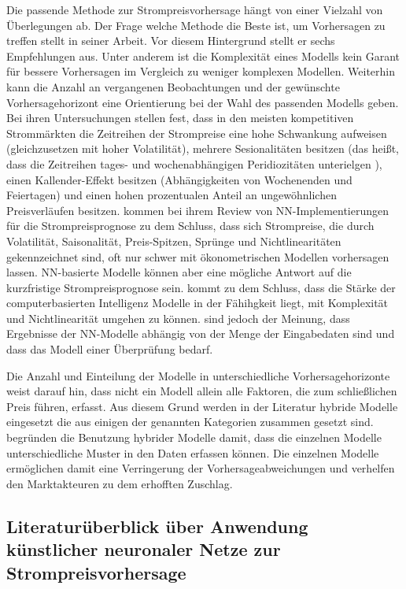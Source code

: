 Die passende Methode zur Strompreisvorhersage hängt von einer Vielzahl von Überlegungen ab. Der Frage welche Methode die Beste ist, um Vorhersagen zu treffen stellt \citet{Chatfield1988} in seiner Arbeit. Vor diesem Hintergrund stellt er sechs Empfehlungen aus. Unter anderem ist die Komplexität eines Modells kein Garant für bessere Vorhersagen im Vergleich zu weniger komplexen Modellen. Weiterhin kann die Anzahl an vergangenen Beobachtungen und der gewünschte Vorhersagehorizont eine Orientierung bei der Wahl des passenden Modells geben.
Bei ihren Untersuchungen stellen \citet{Nogales2002} fest, dass in den meisten kompetitiven Strommärkten die Zeitreihen der Strompreise eine hohe Schwankung aufweisen (gleichzusetzen mit hoher Volatilität), mehrere Sesionalitäten besitzen (das heißt, dass die Zeitreihen tages- und wochenabhängigen Peridiozitäten unterielgen ), einen Kallender-Effekt besitzen (Abhängigkeiten von Wochenenden und Feiertagen) und einen hohen prozentualen Anteil an ungewöhnlichen Preisverläufen besitzen. \citet{Vijayalakshmi2015} kommen bei ihrem Review von NN-Implementierungen für die Strompreisprognose zu dem Schluss, dass sich Strompreise, die durch Volatilität, Saisonalität, Preis-Spitzen, Sprünge und Nichtlinearitäten gekennzeichnet sind, oft nur schwer mit ökonometrischen Modellen vorhersagen lassen. NN-basierte Modelle können aber eine mögliche Antwort auf die kurzfristige Strompreisprognose sein. \citet{Weron2014} kommt zu dem Schluss, dass die Stärke der computerbasierten Intelligenz Modelle in der Fähihgkeit liegt, mit Komplexität und Nichtlinearität umgehen zu können. \citet{Gareta2006} sind jedoch der Meinung, dass Ergebnisse der NN-Modelle abhängig von der Menge der Eingabedaten sind und dass das Modell einer Überprüfung bedarf.

Die Anzahl und Einteilung der Modelle in unterschiedliche Vorhersagehorizonte weist darauf hin, dass nicht ein Modell allein alle Faktoren, die zum schließlichen Preis führen, erfasst. Aus diesem Grund werden in der Literatur hybride Modelle eingesetzt die aus einigen der genannten Kategorien zusammen gesetzt sind. \citet{Cerjan2013} begründen die Benutzung hybrider Modelle damit, dass die einzelnen Modelle unterschiedliche Muster in den Daten erfassen können. Die einzelnen Modelle ermöglichen damit eine Verringerung der Vorhersageabweichungen und verhelfen den Marktakteuren zu dem erhofften Zuschlag.


\subsection{Literaturüberblick über Anwendung künstlicher neuronaler Netze zur Strompreisvorhersage}\label{sec:literaturueberblick}

